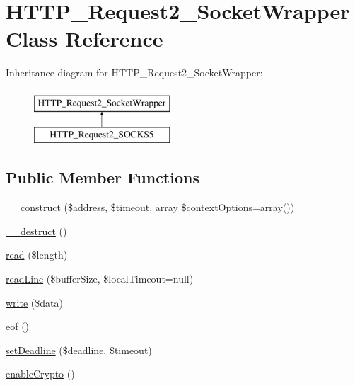 \hypertarget{classHTTP__Request2__SocketWrapper}{}\section{H\+T\+T\+P\+\_\+\+Request2\+\_\+\+Socket\+Wrapper Class Reference}
\label{classHTTP__Request2__SocketWrapper}
Inheritance diagram for H\+T\+T\+P\+\_\+\+Request2\+\_\+\+Socket\+Wrapper\+:\begin{figure}[H]
\begin{center}
\leavevmode
\includegraphics[height=2.000000cm]{classHTTP__Request2__SocketWrapper}
\end{center}
\end{figure}
\subsection*{Public Member Functions}
\begin{DoxyCompactItemize}
\item 
\hyperlink{classHTTP__Request2__SocketWrapper_a3a59e9400c03f4f9aa6b2c2659f22512}{\+\_\+\+\_\+construct} (\$address, \$timeout, array \$context\+Options=array())
\item 
\hyperlink{classHTTP__Request2__SocketWrapper_af5176bcee9170ae7d4d9c00aadbfcde3}{\+\_\+\+\_\+destruct} ()
\item 
\hyperlink{classHTTP__Request2__SocketWrapper_a5e483244689fefacb4b774fde087c60d}{read} (\$length)
\item 
\hyperlink{classHTTP__Request2__SocketWrapper_a7b6d59527741b687f3de869bdd6bb1bf}{read\+Line} (\$buffer\+Size, \$local\+Timeout=null)
\item 
\hyperlink{classHTTP__Request2__SocketWrapper_ac0c9f5044043c4e55efe5f1d71ac63a1}{write} (\$data)
\item 
\hyperlink{classHTTP__Request2__SocketWrapper_a25df9e4044072eabf76add57013b205e}{eof} ()
\item 
\hyperlink{classHTTP__Request2__SocketWrapper_a5bb5243d3cde9ec3eadcdbed1a3ffba4}{set\+Deadline} (\$deadline, \$timeout)
\item 
\hyperlink{classHTTP__Request2__SocketWrapper_a541cea424faf35b039273eb4c5a8472a}{enable\+Crypto} ()
\end{DoxyCompactItemize}
